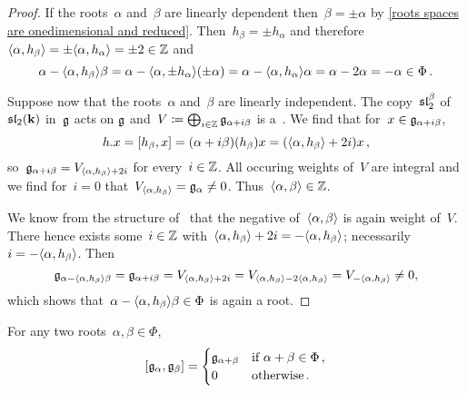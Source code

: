\begin{proof}
  If the roots~$\alpha$ and~$\beta$ are linearly dependent then~$\beta = \pm \alpha$ by \cref{roots spaces are onedimensional and reduced}.
  Then~$h_\beta = \pm h_\alpha$ and therefore~$\langle\alpha, h_\beta\rangle = \pm \langle\alpha, h_\alpha\rangle = \pm 2 \in \mathbb{Z}$ and
  \[
    \alpha - \langle\alpha, h_\beta\rangle \beta
    =
    \alpha - \langle\alpha, \pm h_\alpha\rangle (\pm \alpha)
    =
    \alpha - \langle\alpha, h_\alpha\rangle \alpha
    =
    \alpha - 2 \alpha
    =
    -\alpha \in \Phi  \,.
  \]
 
  Suppose now that the roots~$\alpha$ and~$\beta$ are linearly independent.
  The copy~$\mathfrak{sl}_2^\beta$ of~$\mathfrak{sl}_2(\mathbf{k})$ in~$\mathfrak{g}$ acts on $\mathfrak{g}$ and~$V \coloneqq \bigoplus_{i \in \mathbb{Z}} \mathfrak{g}_{\alpha+i\beta}$ is a~{}.
  We find that for~$x \in \mathfrak{g}_{\alpha + i \beta}$,
  \[
    h.x
    =
    [h_\beta, x]
    =
    (\alpha + i\beta)(h_\beta)x
    =
    (\langle\alpha, h_\beta\rangle + 2i) x \,,
  \]
  so~$\mathfrak{g}_{\alpha+i\beta} = V_{\langle\alpha, h_\beta\rangle+2i}$ for every~$i \in \mathbb{Z}$.
  All occuring weights of~$V$ are integral and we find for~$i = 0$ that~$V_{\langle\alpha, h_\beta\rangle} = \mathfrak{g}_\alpha \neq 0$.
  Thus~$\langle\alpha, \beta\rangle \in \mathbb{Z}$.
  
  We know from the structure of~{} that the negative of~$\langle\alpha, \beta\rangle$ is again weight of~$V$.
  There hence exists some~$i \in \mathbb{Z}$ with~$\langle\alpha, h_\beta\rangle + 2i = -\langle\alpha, h_\beta\rangle$;
  necessarily~$i = -\langle\alpha, h_\beta\rangle$.
  Then
  \[
    \mathfrak{g}_{\alpha - \langle\alpha, h_\beta\rangle \beta}
    =
    \mathfrak{g}_{\alpha + i \beta}
    =
    V_{\langle\alpha, h_\beta\rangle+2i}
    =
    V_{\langle\alpha, h_\beta\rangle - 2\langle\alpha, h_\beta\rangle}
    =
    V_{-\langle\alpha, h_\beta\rangle}
    \neq
    0,
  \]
  which shows that~$\alpha - \langle\alpha, h_\beta\rangle \beta \in \Phi$ is again a root.
\end{proof}


\begin{corollary}
  For any two roots~$\alpha, \beta \in \Phi$,
  \[
    [\mathfrak{g}_\alpha, \mathfrak{g}_\beta]
    =
    \begin{cases}
    \mathfrak{g}_{\alpha+\beta}  & \text{if $\alpha+\beta \in \Phi$} \,, \\
    0                     & \text{otherwise}  \,.
    \end{cases}
  \]
\end{corollary}


